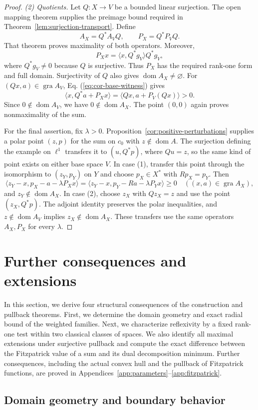 \documentclass[11pt]{article}
\newcommand{\gra}{\operatorname{gra}}
\newcommand{\dom}{\operatorname{dom}}
\newcommand{\pair}[2]{\langle #1,#2\rangle}
\theoremstyle{definition}
\theoremstyle{remark}
\begin{document}
\begin{proof}
\noindent\textit{(2) Quotients.}
Let $Q:X\to V$ be a bounded linear surjection. The open mapping theorem supplies the preimage bound required in Theorem~\ref{lem:surjection-transport}. Define
\[
A_X=Q^*A_VQ,\qquad P_X=Q^*P_VQ.
\]
That theorem proves maximality of both operators. Moreover,
\[
P_Xx=\pair{x}{Q^*g_V}Q^*g_V,
\]
where $Q^*g_V\ne0$ because $Q$ is surjective. Thus $P_X$ has the required rank-one form and full domain. Surjectivity of $Q$ also gives $\dom A_X\ne\varnothing$. For $(Qx,a)\in\gra A_V$, Eq. (\ref{eq:cor-base-witness}) gives
\[
\pair{x}{Q^*a+P_Xx}
=\pair{Qx}{a+P_V(Qx)}>0.
\]
Since $0\notin\dom A_V$, we have $0\notin\dom A_X$. The point $(0,0)$ again proves nonmaximality of the sum.

For the final assertion, fix $\lambda>0$. Proposition~\ref{cor:positive-perturbations} supplies a polar point $(z,p)$ for the sum on $c_0$ with $z\notin\dom A$. The surjection defining the example on $\ell^1$ transfers it to $(u,Q^*p)$, where $Qu=z$, so the same kind of point exists on either base space $V$. In case (1), transfer this point through the isomorphism to $(z_Y,p_Y)$ on $Y$ and choose $p_X\in X^*$ with $Rp_X=p_Y$. Then
\[
\pair{z_Y-x}{p_X-a-\lambda P_Xx}
=\pair{z_Y-x}{p_Y-Ra-\lambda P_Yx}\ge0
\quad((x,a)\in\gra A_X),
\]
and $z_Y\notin\dom A_X$. In case (2), choose $z_X$ with $Qz_X=z$ and use the point $(z_X,Q^*p)$. The adjoint identity preserves the polar inequalities, and $z\notin\dom A_V$ implies $z_X\notin\dom A_X$. These transfers use the same operators $A_X,P_X$ for every $\lambda$.
\end{proof}

\section{Further consequences and extensions}
\label{sec:corollaries}
In this section, we derive four structural consequences of the construction and pullback theorems. First, we determine the domain geometry and exact radial bound of the weighted families. Next, we characterize reflexivity by a fixed rank-one test within two classical classes of spaces. We also identify all maximal extensions under surjective pullback and compute the exact difference between the Fitzpatrick value of a sum and its dual decomposition minimum. Further consequences, including the actual convex hull and the pullback of Fitzpatrick functions, are proved in Appendices~\ref{app:parameters}--\ref{app:fitzpatrick}.

\subsection{Domain geometry and boundary behavior}
\label{subsec:domain-boundary}
\end{document}
